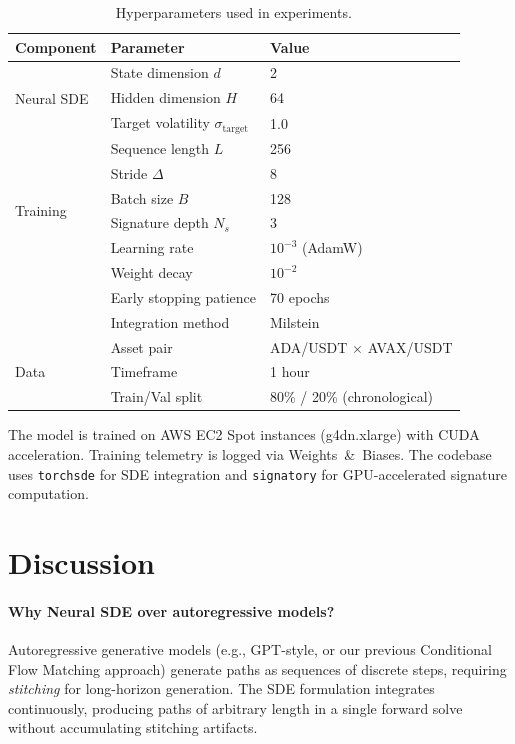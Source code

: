 \documentclass[11pt, a4paper]{article}
\begin{document}
\begin{table}[h]
\centering
\caption{Hyperparameters used in experiments.}
\label{tab:hyperparams}
\begin{tabular}{@{}lll@{}}
\toprule
\textbf{Component} & \textbf{Parameter} & \textbf{Value} \\
\midrule
\multirow{3}{*}{Neural SDE} 
    & State dimension $d$ & 2 \\
    & Hidden dimension $H$ & 64 \\
    & Target volatility $\sigma_{\text{target}}$ & 1.0 \\
\midrule
\multirow{6}{*}{Training}
    & Sequence length $L$ & 256 \\
    & Stride $\Delta$ & 8 \\
    & Batch size $B$ & 128 \\
    & Signature depth $N_s$ & 3 \\
    & Learning rate & $10^{-3}$ (AdamW) \\
    & Weight decay & $10^{-2}$ \\
    & Early stopping patience & 70 epochs \\
    & Integration method & Milstein \\
\midrule
\multirow{3}{*}{Data}
    & Asset pair & ADA/USDT $\times$ AVAX/USDT \\
    & Timeframe & 1 hour \\
    & Train/Val split & 80\% / 20\% (chronological) \\
\bottomrule
\end{tabular}
\end{table}

The model is trained on AWS EC2 Spot instances (g4dn.xlarge) with CUDA acceleration. Training telemetry is logged via Weights~\&~Biases. The codebase uses \texttt{torchsde} for SDE integration and \texttt{signatory} for GPU-accelerated signature computation.

\section{Discussion}
\label{sec:discussion}

\paragraph{Why Neural SDE over autoregressive models?}
Autoregressive generative models (e.g., GPT-style, or our previous Conditional Flow Matching approach) generate paths as sequences of discrete steps, requiring \emph{stitching} for long-horizon generation. The SDE formulation integrates continuously, producing paths of arbitrary length in a single forward solve without accumulating stitching artifacts.
\end{document}
